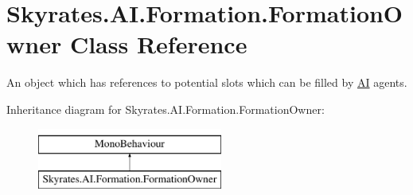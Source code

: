 \hypertarget{class_skyrates_1_1_a_i_1_1_formation_1_1_formation_owner}{\section{Skyrates.\-A\-I.\-Formation.\-Formation\-Owner Class Reference}
\label{class_skyrates_1_1_a_i_1_1_formation_1_1_formation_owner}
}


An object which has references to potential slots which can be filled by \hyperlink{namespace_skyrates_1_1_a_i}{A\-I} agents.  


Inheritance diagram for Skyrates.\-A\-I.\-Formation.\-Formation\-Owner\-:\begin{figure}[H]
\begin{center}
\leavevmode
\includegraphics[height=2.000000cm]{class_skyrates_1_1_a_i_1_1_formation_1_1_formation_owner}
\end{center}
\end{figure}
